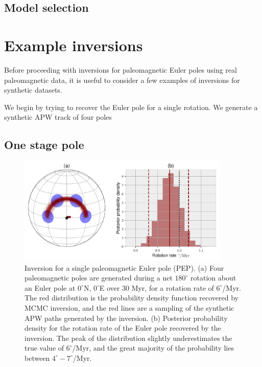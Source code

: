 \documentclass[preprint,12pt,authoryear]{elsarticle}
\begin{document}
\subsection{Model selection}

\section{Example inversions}
\label{sec:example_inversion}

Before proceeding with inversions for paleomagnetic Euler poles using real paleomagnetic data,
it is useful to consider a few examples of inversions for synthetic datasets.

We begin by trying to recover the Euler pole for a single rotation.
We generate a synthetic APW track of four poles

\subsection{One stage pole}

\begin{figure}
\includegraphics[width=0.9\textwidth]{figures/synthetic/one_euler_pole.pdf}
\caption[Inversion for a single paleomagnetic Euler pole.]{Inversion for a single paleomagnetic Euler pole (PEP). (a) Four paleomagnetic poles are generated during a net $180^\circ$ rotation about an Euler pole at $0^\circ$N, $0^\circ$E over 30 Myr, for a rotation rate of $6^\circ$/Myr. The red distribution is the probability density function recovered by MCMC inversion, and the red lines are a sampling of the synthetic APW paths generated by the inversion. (b) Posterior probability density for the rotation rate of the Euler pole recovered by the inversion. The peak of the distribution slightly underestimates the true value of $6^\circ$/Myr, and the great majority of the probability lies between $4^\circ-7^\circ$/Myr. }
\label{fig:one_euler_pole}
\end{figure}
\end{document}
